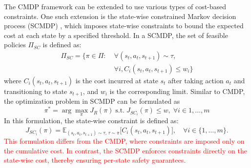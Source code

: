 The CMDP framework can be extended to use various types of cost-based constraints.
One such extension is the state-wise constrained Markov decision process (SCMDP) \cite{zhao2023state}, which imposes state-wise constraints to bound the expected cost at each state by a specified threshold.
In a SCMDP, the set of feasible policies $\Pi_{SC}$ is defined as:
\begin{equation} \label{eq:feasible_policy_set_scmdp}
    \begin{aligned}    
        \Pi_{SC} = \{ \pi \in \Pi: &\; \forall (s_t, a_t, s_{t + 1}) \sim \tau, \\
                                &\; \forall i, C_i(s_t, a_t, s_{t + 1}) \leq w_i \}
    \end{aligned}
\end{equation}
where $C_i(s_t, a_t, s_{t + 1})$ is the cost incurred at state $s_t$ after taking action $a_t$ and transitioning to state $s_{t + 1}$, and $w_i$ is the corresponding limit.
Similar to CMDP, the optimization problem in SCMDP can be formulated as
\begin{equation} \label{eq:scmdp_optimization_problem}
    \pi^* = \arg\max_\pi J_R(\pi) \; \text{s.t.} \; J_{SC_i}(\pi) \leq w, \; \forall i \in 1, \ldots, m
\end{equation}  %
In this formulation, the state-wise constraint is defined as:
\begin{equation} \label{eq:statewise_cost_return}
    J_{SC_i}(\pi) = \mathbb{E}_{(s_t, a_t, s_{t + 1}) \sim \tau, \, \tau \sim \pi} \big[ C_i(s_t, a_t, s_{t + 1}) \big], 
    \quad \forall i \in \{1, \ldots, m\}.
\end{equation}
\textcolor{red}{This formulation differs from the CMDP, where constraints are imposed only on the cumulative cost.}
\textcolor{red}{In contrast, the SCMDP enforces constraints directly on the state-wise cost, thereby ensuring per-state safety guarantees.}


